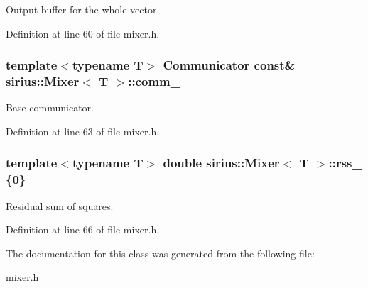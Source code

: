 Output buffer for the whole vector. 



Definition at line 60 of file mixer.\+h.

\hypertarget{classsirius_1_1_mixer_a920558ecc11adbe9ea9a6aa968ba1f8c}{}
\subsubsection[{comm\+\_\+}]{\setlength{\rightskip}{0pt plus 5cm}template$<$typename T$>$ Communicator const\& {\bf sirius\+::\+Mixer}$<$ T $>$\+::comm\+\_\+\hspace{0.3cm}{\ttfamily [protected]}}\label{classsirius_1_1_mixer_a920558ecc11adbe9ea9a6aa968ba1f8c}


Base communicator. 



Definition at line 63 of file mixer.\+h.

\hypertarget{classsirius_1_1_mixer_aac22bb1bd9611d5783d32b9802c893f4}{}
\subsubsection[{rss\+\_\+}]{\setlength{\rightskip}{0pt plus 5cm}template$<$typename T$>$ double {\bf sirius\+::\+Mixer}$<$ T $>$\+::rss\+\_\+ \{0\}\hspace{0.3cm}{\ttfamily [protected]}}\label{classsirius_1_1_mixer_aac22bb1bd9611d5783d32b9802c893f4}


Residual sum of squares. 



Definition at line 66 of file mixer.\+h.



The documentation for this class was generated from the following file\+:\begin{DoxyCompactItemize}
\item 
\hyperlink{mixer_8h}{mixer.\+h}\end{DoxyCompactItemize}
